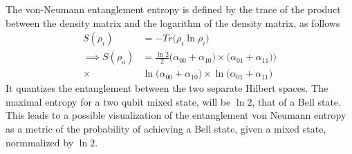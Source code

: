 The von-Neumann entanglement entropy is defined by the trace of the product between the density matrix and the logarithm of the density matrix, as follows
\begin{align}
    S(\rho_i) &= - Tr\Big(\rho_i \ln \rho_i\Big) \\
    \implies S(\rho_a)& = \frac{\ln2}{2}\Big(\alpha_{00}+\alpha_{10}\big) \times \big(\alpha_{01}+\alpha_{11}\big)\Big)\\ \times&\ln\big(\alpha_{00}+\alpha_{10}\big) \times\ln \big(\alpha_{01}+\alpha_{11}\big) \nonumber
\end{align}
It quantizes the entanglement between the two separate Hilbert spaces. The maximal entropy for a two qubit mixed state, will be $\ln 2$, that of a Bell state. This leads to a possible visualization of the entanglement von Neumann entropy as a metric of the probability of achieving a Bell state, given a mixed state, normmalized by $\ln 2$.
